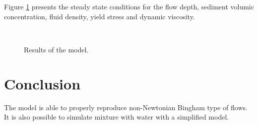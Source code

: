 Figure \ref{pseudo-biphasic:results} presents the steady state conditions for
the flow depth, sediment volumic concentration, fluid density, yield stress and
dynamic viscosity.

\begin{figure}[!htbp]
 \centering
 \\
 \caption{Results of the model.}
 \label{pseudo-biphasic:results}
\end{figure}

\section{Conclusion}

The model is able to properly reproduce non-Newtonian Bingham type of flows.
It is also possible to simulate mixture with water with a simplified model.
